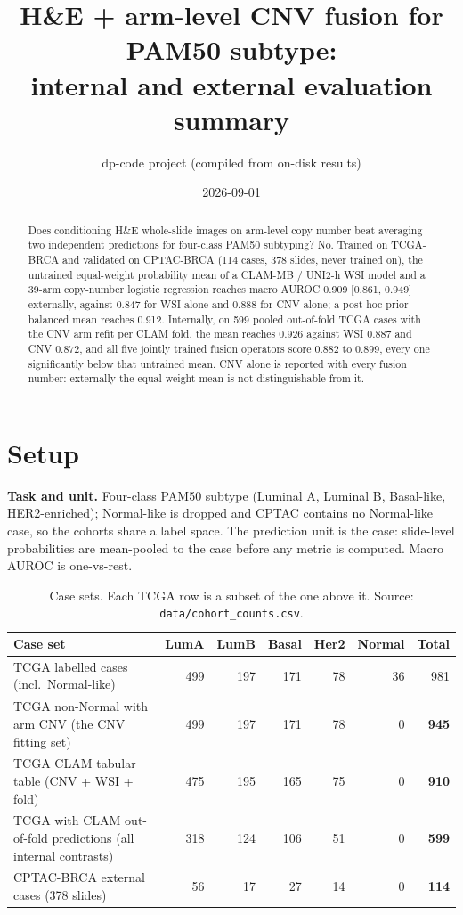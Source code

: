 \documentclass[10pt,a4paper]{article}
\title{\vspace{-1.2em}H\&E + arm-level CNV fusion for PAM50 subtype:\\
internal and external evaluation summary}
\author{dp-code project (compiled from on-disk results)}
\date{2026-09-01}
\newcommand{\best}[1]{\textbf{#1}}
\begin{document}
\maketitle
\vspace{-1.2em}

\begin{abstract}
\noindent
Does conditioning H\&E whole-slide images on arm-level copy number beat averaging two independent
predictions for four-class PAM50 subtyping? No. Trained on TCGA-BRCA and validated on CPTAC-BRCA
(114 cases, 378 slides, never trained on), the untrained equal-weight probability mean of a
CLAM-MB / UNI2-h WSI model and a 39-arm copy-number logistic regression reaches macro AUROC
0.909 [0.861, 0.949] externally, against 0.847 for WSI alone and 0.888 for CNV alone; a post hoc
prior-balanced mean reaches 0.912. Internally, on 599 pooled out-of-fold TCGA cases with the CNV
arm refit per CLAM fold, the mean reaches 0.926 against WSI 0.887 and CNV 0.872, and all five
jointly trained fusion operators score 0.882 to 0.899, every one significantly below that
untrained mean. CNV alone is reported with every fusion number: externally the equal-weight mean
is not distinguishable from it.
\end{abstract}

\section{Setup}

\textbf{Task and unit.} Four-class PAM50 subtype (Luminal A, Luminal B, Basal-like,
HER2-enriched); Normal-like is dropped and CPTAC contains no Normal-like case, so the cohorts
share a label space. The prediction unit is the case: slide-level probabilities are mean-pooled to
the case before any metric is computed. Macro AUROC is one-vs-rest.

\begin{table}[H]
\centering
\footnotesize
\setlength{\tabcolsep}{4pt}
\caption{Case sets. Each TCGA row is a subset of the one above it.
Source: \texttt{data/cohort\_counts.csv}.}
\label{tab:cohort}
\begin{tabular}{@{}lrrrrrr@{}}
\toprule
Case set & LumA & LumB & Basal & Her2 & Normal & Total \\
\midrule
TCGA labelled cases (incl.\ Normal-like) & 499 & 197 & 171 & 78 & 36 & 981 \\
TCGA non-Normal with arm CNV (the CNV fitting set) & 499 & 197 & 171 & 78 & 0 & \best{945} \\
TCGA CLAM tabular table (CNV + WSI + fold) & 475 & 195 & 165 & 75 & 0 & \best{910} \\
TCGA with CLAM out-of-fold predictions (all internal contrasts) & 318 & 124 & 106 & 51 & 0 & \best{599} \\
\midrule
CPTAC-BRCA external cases (378 slides) & 56 & 17 & 27 & 14 & 0 & \best{114} \\
\bottomrule
\end{tabular}
\end{table}
\end{document}
